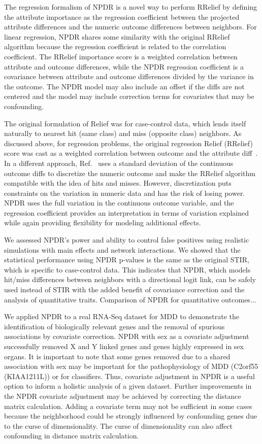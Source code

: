 \documentclass[10pt]{article}
\begin{document}
The regression formalism of NPDR is a novel way to perform RRelief by defining the attribute importance as the regression coefficient between the projected attribute differences and the numeric outcome differences between neighbors.  For linear regression, NPDR shares some similarity with the original RRelief algorithm because the regression coefficient is related to the correlation coefficient. The RRelief importance score is a weighted correlation between attribute and outcome differences, while the NPDR regression coefficient is a covariance between attribute and outcome differences divided by the variance in the outcome. The NPDR model may also include an offset if the diffs are not centered and the model may include correction terms for covariates that may be confounding. 

The original formulation of Relief was for case-control data, which lends itself naturally to nearest hit (same class) and miss (opposite class) neighbors. As discussed above, for regression problems, the original regression Relief (RRelief) score was cast as a weighted correlation between outcome and the attribute diff~\cite{robnik03}. In a different approach, Ref.~\cite{urbanowicz17} uses a standard deviation of the continuous outcome diffs to discretize the numeric outcome and make the RRelief algorithm compatible with the idea of hits and misses. However, discretization puts constraints on the variation in numeric data and has the risk of losing power. NPDR uses the full variation in the continuous outcome variable, and the regression coefficient provides an interpretation in terms of variation explained while again providing flexibility for modeling additional effects. 

We assessed NPDR's power and ability to control false positives using realistic simulations with main effects and network interactions. We showed that the statistical performance using NPDR p-values is the same as the original STIR, which is specific to case-control data. This indicates that NPDR, which models hit/miss differences between neighbors with a directional logit link, can be safely used instead of STIR with the added benefit of covariance correction and the analysis of quantitative traits. Comparison of NPDR for quantitative outcomes... 

We applied NPDR to a real RNA-Seq dataset for MDD to demonstrate the identification of biologically relevant genes and the removal of spurious associations by covariate correction. NPDR with sex as a covariate adjustment successfully removed X and Y linked genes and genes highly expressed in sex organs. It is important to note that some genes removed due to a shared association with sex may be important for the pathophysiology of MDD (C2orf55 (KIAA1211L)) or for classifiers.  Thus, covariate adjustment in NPDR is a useful option to inform a holistic analysis of a given dataset. Further improvements in the NPDR covariate adjustment may be achieved by correcting the distance matrix calculation. Adding a covariate term may not be sufficient in some cases because the neighborhood could be strongly influenced by confounding genes due to the curse of dimensionality. The curse of dimensionality can also affect confounding in distance matrix calculation.
\end{document}
